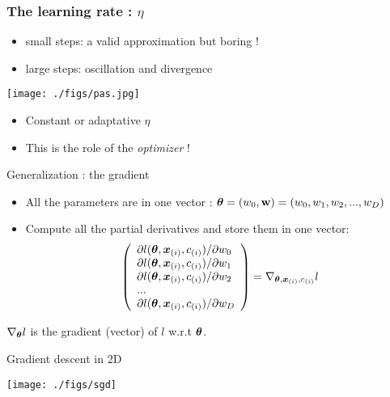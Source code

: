 \begin{frame}
  \frametitle{The learning rate : $\eta$}

\begin{itemize}
  \item small  steps: a valid approximation but boring ! 
  \item large steps: oscillation and divergence 
\end{itemize}
  \begin{center}
    \texttt{[image: ./figs/pas.jpg]}
  \end{center}

  \begin{itemize}
    \item Constant or adaptative $\eta$
    \item This is the role of the \textit{optimizer} !
  \end{itemize}
\end{frame}


\begin{frame}{Generalization : the gradient}
  \begin{itemize}
  \item All the parameters are in one vector : $\boldsymbol{\theta} = (w_0,\mathbf{w}) = (w_0,w_1,w_2,... ,w_{D})$
  \item Compute all the partial derivatives and store them in one
    vector: 
    \begin{displaymath}
              \left(
          \begin{array}{l}
            \partial{\ensuremath{l}(\ensuremath{\boldsymbol{\theta}},\ensuremath{\boldsymbol{x}_{(i)}},\ensuremath{{c}_{(i)}})}/\partial{w_0}\\
            \partial{\ensuremath{l}(\ensuremath{\boldsymbol{\theta}},\ensuremath{\boldsymbol{x}_{(i)}},\ensuremath{{c}_{(i)}})}/\partial{w_1}\\
            \partial{\ensuremath{l}(\ensuremath{\boldsymbol{\theta}},\ensuremath{\boldsymbol{x}_{(i)}},\ensuremath{{c}_{(i)}})}/\partial{w_2}\\
...\\
            \partial{\ensuremath{l}(\ensuremath{\boldsymbol{\theta}},\ensuremath{\boldsymbol{x}_{(i)}},\ensuremath{{c}_{(i)}})}/\partial{w_{\ensuremath{D}}}
            \end{array} 
          \right) = \nabla_{\boldsymbol{\theta},\boldsymbol{x}_{(i)},{c}_{(i)}} l
    \end{displaymath}
  \end{itemize}
  
  \begin{center}
    $\nabla_{\boldsymbol{\theta}} l$ is the gradient (vector)  of $l$ w.r.t $\boldsymbol{\theta}$.
  \end{center}
\end{frame}

\begin{frame}{Gradient descent in 2D }
  \begin{center}
    \texttt{[image: ./figs/sgd]}
  \end{center}
\end{frame}



